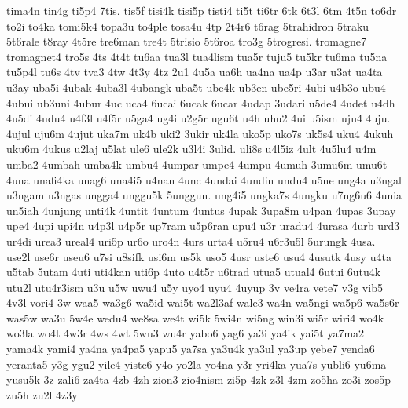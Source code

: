 tima4n
tin4g
ti5p4
7tis.
tis5f
tisi4k
tisi5p
tisti4
ti5t
ti6tr
6tk
6t3l
6tm
4t5n
to6dr
to2i
to4ka
tomi5k4
topa3u
to4ple
tosa4u
4tp
2t4r6
t6rag
5trahidron
5traku
5t6rale
t8ray
4t5re
tre6man
tre4t
5trisio
5t6roa
tro3g
5trogresi.
tromagne7
tromagnet4
tro5s
4ts
4t4t
tu6aa
tua3l
tua4lism
tua5r
tuju5
tu5kr
tu6ma
tu5na
tu5p4l
tu6s
4tv
tva3
4tw
4t3y
4tz
2u1
4u5a
ua6h
ua4na
ua4p
u3ar
u3at
ua4ta
u3ay
uba5i
4ubak
4uba3l
4ubangk
uba5t
ube4k
ub3en
ube5ri
4ubi
u4b3o
ubu4
4ubui
ub3uni
4ubur
4uc
uca4
6ucai
6ucak
6ucar
4udap
3udari
u5de4
4udet
u4dh
4u5di
4udu4
u4f3l
u4f5r
u5ga4
ug4i
u2g5r
ugu6t
u4h
uhu2
4ui
u5ism
uju4
4uju.
4ujul
uju6m
4ujut
uka7m
uk4b
uki2
3ukir
uk4la
uko5p
uko7s
uk5s4
uku4
4ukuh
uku6m
4ukus
u2laj
u5lat
ule6
ule2k
u3l4i
3ulid.
uli8s
u4l5iz
4ult
4u5lu4
u4m
umba2
4umbah
umba4k
umbu4
4umpar
umpe4
4umpu
4umuh
3umu6m
umu6t
4una
unafi4ka
unag6
una4i5
u4nan
4unc
4undai
4undin
undu4
u5ne
ung4a
u3ngal
u3ngam
u3ngas
ungga4
unggu5k
5unggun.
ung4i5
ungka7s
4ungku
u7ng6u6
4unia
un5iah
4unjung
unti4k
4untit
4untum
4untus
4upak
3upa8m
u4pan
4upas
3upay
upe4
4upi
upi4n
u4p3l
u4p5r
up7ram
u5p6ran
upu4
u3r
uradu4
4urasa
4urb
urd3
ur4di
urea3
ureal4
uri5p
ur6o
uro4n
4urs
urta4
u5ru4
u6r3u5l
5urungk
4usa.
use2l
use6r
useu6
u7si
u8sifk
usi6m
us5k
uso5
4usr
uste6
usu4
4usutk
4usy
u4ta
u5tab
5utam
4uti
uti4kan
uti6p
4uto
u4t5r
u6trad
utua5
utual4
6utui
6utu4k
utu2l
utu4r3ism
u3u
u5w
uwu4
u5y
uyo4
uyu4
4uyup
3v
ve4ra
vete7
v3g
vib5
4v3l
vori4
3w
waa5
wa3g6
wa5id
wai5t
wa2l3af
wale3
wa4n
wa5ngi
wa5p6
wa5s6r
was5w
wa3u
5w4e
wedu4
we8sa
we4t
wi5k
5wi4n
wi5ng
win3i
wi5r
wiri4
wo4k
wo3la
wo4t
4w3r
4ws
4wt
5wu3
wu4r
yabo6
yag6
ya3i
ya4ik
yai5t
ya7ma2
yama4k
yami4
ya4na
ya4pa5
yapu5
ya7sa
ya3u4k
ya3ul
ya3up
yebe7
yenda6
yeranta5
y3g
ygu2
yile4
yiste6
y4o
yo2la
yo4na
y3r
yri4ka
yua7s
yubli6
yu6ma
yusu5k
3z
zali6
za4ta
4zb
4zh
zion3
zio4nism
zi5p
4zk
z3l
4zm
zo5ha
zo3i
zos5p
zu5h
zu2l
4z3y
